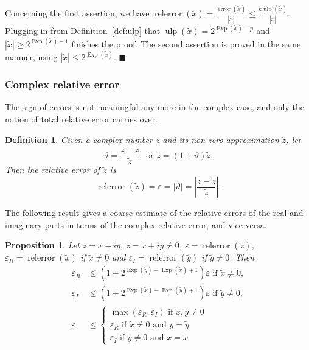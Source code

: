 \documentclass [11pt]{article}
\newcommand {\corr}[1]{{#1}}
\newcommand {\appro}[1]{\widetilde {#1}}
\newcommand {\Ulp}{{\operatorname {ulp}}}
\DeclareMathOperator{\Exp}{\operatorname {Exp}}
\newcommand{\error}{\operatorname {error}}
\newcommand{\relerror}{\operatorname {relerror}}
\renewcommand {\epsilon}{\varepsilon}
\renewcommand {\theta}{\vartheta}
\renewcommand {\leq}{\leqslant}
\renewcommand {\geq}{\geqslant}
\newtheorem{definition}[theorem]{Definition}
\newtheorem{prop}[theorem]{Proposition}
\newenvironment{proof}{\noindent{\bf Proof:}}{{\hspace* {\fill}$\blacksquare$}}
\begin{document}
\begin {proof}
Concerning the first assertion, we have
$
\relerror (\appro x) = \frac {\error (\appro x)}{|\appro x|}
\leq
\frac {k \Ulp (\appro x)}{|\appro x|}.
$
Plugging in from Definition~\ref {def:ulp} that
$\Ulp (\appro x) = 2^{\Exp (\appro x) - p}$ and
$|\appro x| \geq 2^{\Exp (\appro x) - 1}$ finishes the proof.
The second assertion is proved in the same manner, using
$|\appro x| \leq 2^{\Exp (\appro x)}$.
\end {proof}


\subsubsection {Complex relative error}
\label {sssec:comrelerror}

The sign of errors is not meaningful any more in the complex case, and
only the notion of total relative error carries over.

\begin {definition}
\label {def:comrelerror}
Given a complex number $\corr z$ and its non-zero approximation
$\appro z$, let
\[
\theta = \frac {\corr z - \appro z}{\appro z},
\text { or }
\corr z = (1 + \theta) \appro z.
\]
Then the {\em relative error} of $\appro z$ is
\[
\relerror (\appro z) = \epsilon = | \theta |
= \left| \frac {\corr z - \appro z}{\appro z} \right|.
\]
\end {definition}

The following result gives a coarse
estimate of the relative errors of the real and imaginary parts in terms of
the complex relative error, and vice versa.

\begin {prop}
\label {prop:comrelerror}
Let $\corr z = \corr x + i \corr y$,
$\appro z = \appro x + i \appro y \neq 0$,
$\epsilon = \relerror (\appro z)$,
$\epsilon_R = \relerror (\appro x)$ if $\appro x \neq 0$ and
$\epsilon_I = \relerror (\appro y)$ if $\appro y \neq 0$. Then
\begin {align*}
\epsilon_R
&\leq \left( 1 + 2^{\Exp (\appro y) - \Exp (\appro x) + 1} \right) \epsilon
\text { if } \appro x \neq 0, \\
\epsilon_I
&\leq \left( 1 + 2^{\Exp (\appro x) - \Exp (\appro y) + 1} \right) \epsilon
\text { if } \appro y \neq 0, \\
\epsilon
&\leq \left\{
\begin {array}{l}
\max \left( \epsilon_R, \epsilon_I \right)
\text { if } \appro x, \appro y \neq 0 \\
\epsilon_R \text { if } \appro x \neq 0 \text { and } \corr y = \appro y \\
\epsilon_I \text { if } \appro y \neq 0 \text { and } \corr x = \appro x
\end {array}
\right.
\end {align*}
\end {prop}
\end{document}
